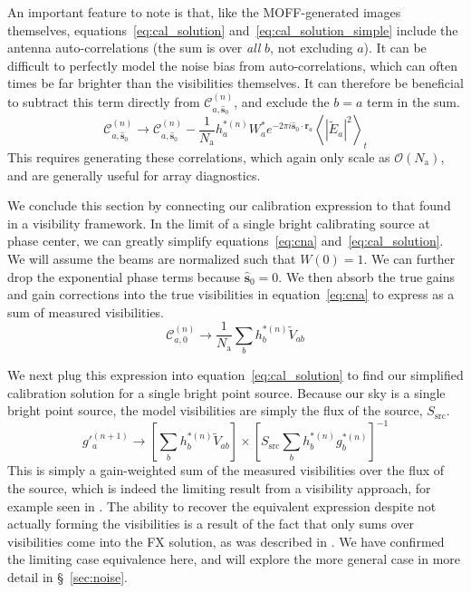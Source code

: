 \documentclass[a4paper,fleqn,usenatbib]{../mnras}
\newcommand{\Nant}{\ensuremath{N_{\mathrm{a}}}}
\newcommand{\spix}{\ensuremath{\hat{\mathbf{s}}_{0}}}
\newcommand{\Cna}[1][n]{\ensuremath{\mathcal{C}^{(#1)}_{a,\spix}}}
\newcommand{\ra}{\ensuremath{\mathbf{r}_a}}
\newcommand{\beamtheta}{\ensuremath{W}}
\newcommand{\Er}[1]{\ensuremath{\widetilde{E}_{#1}}}
\newcommand{\V}{\ensuremath{\widetilde{V}}}
\begin{document}
An important feature to note is that, like the MOFF-generated images themselves, equations~\ref{eq:cal_solution} and~\ref{eq:cal_solution_simple} include the antenna auto-correlations (the sum is over \emph{all} $b$, not excluding $a$). It can be difficult to perfectly model the noise bias from auto-correlations, which can often times be far brighter than the visibilities themselves. It can therefore be beneficial to subtract this term directly from \Cna, and exclude the $b=a$ term in the sum.
\begin{equation}
\Cna \rightarrow \Cna - \frac{1}{\Nant} h^{*(n)}_a\beamtheta^*_a e^{-2\pi i \spix \cdot \ra} \left<|\Er{a}|^2\right>_t
\end{equation}
This requires generating these correlations, which again only scale as $\mathcal{O}(\Nant)$, and are generally useful for array diagnostics.

We conclude this section by connecting our calibration expression to that found in a visibility framework. In the limit of a single bright calibrating source at phase center, we can greatly simplify equations~\ref{eq:cna} and~\ref{eq:cal_solution}. We will assume the beams are normalized such that $\beamtheta(0)=1$. We can further drop the exponential phase terms because $\spix=0$. We then absorb the true gains and gain corrections into the true visibilities in equation~\ref{eq:cna} to express as a sum of measured visibilities.
\begin{equation}
\mathcal{C}^{(n)}_{a,0} \rightarrow \frac{1}{\Nant}\sum_b h^{*(n)}_b \V_{ab}
\end{equation}

We next plug this expression into equation~\ref{eq:cal_solution} to find our simplified calibration solution for a single bright point source. Because our sky is a single bright point source, the model visibilities are simply the flux of the source, $S_{\mathrm{src}}$.
\begin{equation}
g'^{(n+1)}_a \rightarrow \left[\sum_b h^{*(n)}_b \V_{ab}\right] \times \left[S_{\mathrm{src}}\sum_b h^{*(n)}_b g^{*(n)}_b\right]^{-1}
\end{equation}
This is simply a gain-weighted sum of the measured visibilities over the flux of the source, which is indeed the limiting result from a visibility approach, for example seen in \citealt{mit08}. The ability to recover the equivalent expression despite not actually forming the visibilities is a result of the fact that only sums over visibilities come into the FX solution, as was described in \citealt{mor11}. We have confirmed the limiting case equivalence here, and will explore the more general case in more detail in \S~\ref{sec:noise}.
\end{document}
